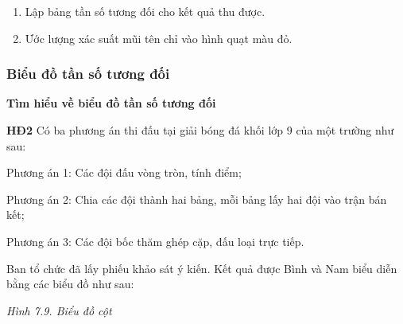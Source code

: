 \begin{lesson}
    \begin{enumerate}[label=\alph*)]
        \item Lập bảng tần số tương đối cho kết quả thu được.

        \answerline
        \answerline

        \item Ước lượng xác suất mũi tên chỉ vào hình quạt màu đỏ.

        \answerline
    \end{enumerate}

    \subsubsection{Biểu đồ tần số tương đối}

    \textbf{Tìm hiểu về biểu đồ tần số tương đối}

    \textbf{HĐ2} Có ba phương án thi đấu tại giải bóng đá khối lớp 9 của một trường như sau:

    Phương án 1: Các đội đấu vòng tròn, tính điểm;

    Phương án 2: Chia các đội thành hai bảng, mỗi bảng lấy hai đội vào trận bán kết;

    Phương án 3: Các đội bốc thăm ghép cặp, đấu loại trực tiếp.

    Ban tổ chức đã lấy phiếu khảo sát ý kiến. Kết quả được Bình và Nam biểu diễn bằng các biểu đồ như sau:

    \begin{center}

    \textit{Hình 7.9. Biểu đồ cột}
    \end{center}


\end{lesson}

